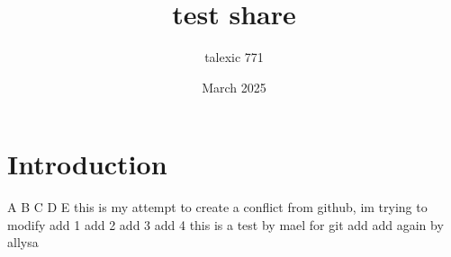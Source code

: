 \documentclass{article}
\title{test share}
\author{talexic 771 }
\date{March 2025}
\begin{document}
\maketitle

\section{Introduction}
A
B
C
D
E
this is my attempt to create a conflict
from github, im trying to modify
add 1
add 2
add 3
add 4
this is a test by mael for git
add
add again by allysa
\end{document}
